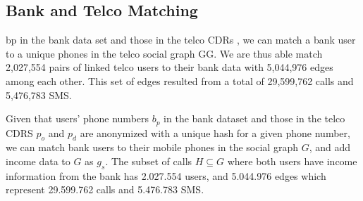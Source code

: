 \subsection{Bank and Telco Matching}

 bp in the bank data set and those in the telco CDRs , we can match a bank user to a unique phones in the telco social graph GG. We are thus able match 2,027,554 pairs of linked telco users to their bank data with 5,044,976 edges among each other. This set of edges resulted from a total of 29,599,762 calls and 5,476,783 SMS.

Given that users' phone numbers \( b_p \) in the bank dataset and those in the telco CDRS \( p_o \) and \( p_d \) are anonymized with a unique hash for a given phone number, we can match bank users to their mobile phones in the social graph $ G $, and add income data to \( G \) as \( g_s \). The subset of calls \( H \subseteq G \) where both users have income information from the bank has \num{2,027,554} users, and \num{5,044,976} edges which represent \num{29,599,762} calls and \num{5,476,783} SMS.

